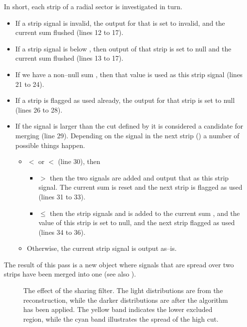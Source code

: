 In short, each strip  of a radial sector is investigated in
turn.  
\begin{itemize}
\item If a strip signal  is invalid, the output for that is
  set to invalid, and the current sum flushed (lines 12 to 17).
\item If a strip signal is below , then output of that
  strip is set to null and the current sum flushed (lines 13 to 17).
\item If we have a non--null sum , then that value is used
  as this strip signal (lines 21 to 24).  
\item If a strip is flagged as used already, the output for that strip
  is set to null (lines 26 to 28).
\item If the signal  is larger than the cut defined by
   it is considered a candidate for merging (line 29).
  Depending on the signal in the next strip () a number of
  possible things happen.
  \begin{itemize}
  \item {} $<$  or  $<$ 
    (line 30), then
    \begin{itemize}
    \item {} $>$  then the two signals are added
      and output that as this strip  signal.  The current
      sum  is reset and the next strip is flagged as used
      (lines 31 to 33).
    \item {} $\le$  then the strip signals
       and  is added to the current sum
      , and the value of this strip is set to null, and the
      next strip flagged as used (lines 34 to 36).
    \end{itemize}
  \item Otherwise, the current strip signal  is output
    as--is.
  \end{itemize}
\end{itemize}
The result of this pass is a new \ESD{} object where signals that are
spread over two strips have been merged into one (see also
).

\begin{figure}[htbp]
  \centering
  \caption{The effect of the sharing filter.  The light distributions
    are from the reconstruction, while the darker distributions are
    after the algorithm has been applied.  The yellow band indicates
    the lower excluded region, while the cyan band illustrates the
    spread of the high cut. }
  \label{fig:sharing:effect}
\end{figure}

